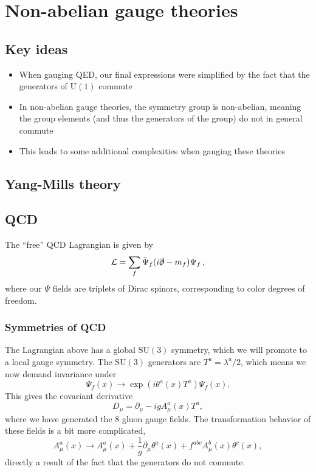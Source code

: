 \documentclass[12pt]{memoir}
\begin{document}
\chapter{Non-abelian gauge theories}

\section{Key ideas}

\begin{itemize}
  \item When gauging QED, our final expressions were simplified by the fact that the generators of $\text{U}(1)$ commute
  \item In non-abelian gauge theories, the symmetry group is non-abelian,
    meaning the group elements (and thus the generators of the group) do not in general commute
  \item This leads to some additional complexities when gauging these theories
\end{itemize}

\section{Yang-Mills theory}

\section{QCD}

The ``free'' QCD Lagrangian is given by
\begin{equation}\label{eq:qcd_free}
  \mathcal{L} = \sum_{f} \bar{\Psi}_f (i \slashed{\partial} - m_f) \Psi_f\,,
\end{equation}
where our $\Psi$ fields are triplets of Dirac spinors, corresponding to color degrees of freedom.

\subsection{Symmetries of QCD}

The Lagrangian above has a global $\text{SU}(3)$ symmetry,
which we will promote to a local gauge symmetry.
The $\text{SU}(3)$ generators are $T^a=\lambda^a / 2$, which means we now demand invariance under
\begin{equation}
  \Psi_f(x) \rightarrow \exp(i\theta^a(x)T^a)\Psi_f(x).
\end{equation}
This gives the covariant derivative
\begin{equation}
  D_{\mu} = \partial_{\mu} - i g A_{\mu}^a(x) T^a,
\end{equation}
where we have generated the 8 gluon gauge fields.
The transformation behavior of these fields is a bit more complicated,
\begin{equation}
  A_{\mu}^a(x) \rightarrow A_{\mu}^a(x) + \frac{1}{g} \partial_{\mu} \theta^a(x) + f^{abc}A_{\mu}^b(x)\theta^c(x),
\end{equation}
directly a result of the fact that the generators do not commute.
\end{document}
